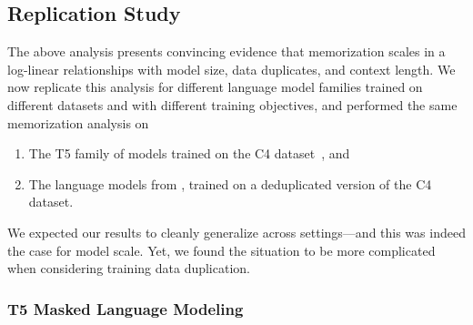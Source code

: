 \subsection{Replication Study}

The above analysis presents convincing evidence that memorization scales in a log-linear relationships with model size, data duplicates, and context length.
%
We now replicate this analysis for different language model families trained on different datasets
and with different training objectives, and performed the same memorization analysis on
\begin{enumerate}[noitemsep,topsep=0pt]
\item The T5 family of models trained on the C4 dataset~\citep{t52020}, and
\item The language models from \citet{lee2021deduplicating}, trained on a deduplicated version of the C4 dataset.
\end{enumerate}
%
We expected our results to cleanly generalize across settings---and this was indeed the case for model scale. Yet, we found the situation to be more complicated when considering training data duplication.

\subsubsection{T5 Masked Language Modeling}

